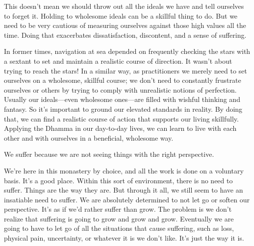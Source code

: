 This doesn't mean we should throw out all the ideals we have and tell 
ourselves to forget it. Holding to wholesome ideals can be a skillful 
thing to do. But we need to be very cautious of measuring ourselves 
against those high values all the time. Doing that exacerbates 
dissatisfaction, discontent, and a sense of suffering.

In former times, navigation at sea depended on frequently checking the 
stars with a sextant to set and maintain a realistic course of 
direction. It wasn't about trying to reach the stars! In a similar way, 
as practitioners we merely need to set ourselves on a wholesome, 
skillful course; we don't need to constantly frustrate ourselves or 
others by trying to comply with unrealistic notions of perfection. 
Usually our ideals---even wholesome ones---are filled with wishful 
thinking and fantasy. So it's important to ground our elevated 
standards in reality. By doing that, we can find a realistic course of 
action that supports our living skillfully. Applying the Dhamma in our 
day-to-day lives, we can learn to live with each other and with 
ourselves in a beneficial, wholesome way.


We suffer because we are not seeing things with the right perspective.

We're here in this monastery by choice, and all the work is done on a 
voluntary basis. It's a good place. Within this sort of environment, 
there is no need to suffer. Things are the way they are. But through it 
all, we still seem to have an insatiable need to suffer. We are 
absolutely determined to not let go or soften our perspective. It's as 
if we'd rather suffer than grow. The problem is we don't realize that 
suffering is going to grow and grow and grow. Eventually we are going 
to have to let go of all the situations that cause suffering, such as 
loss, physical pain, uncertainty, or whatever it is we don't like. It's 
just the way it is.

